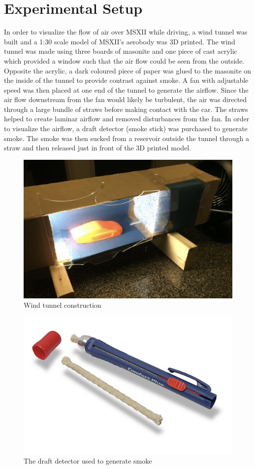 \documentclass[12pt]{article}
\begin{document}
\section{Experimental Setup}
In order to visualize the flow of air over MSXII while driving, a wind tunnel was built and a 1:30 scale model of MSXII's aerobody was 3D printed. The wind tunnel was made using three boards of masonite and one piece of cast acrylic which provided a window such that the air flow could be seen from the outside. Opposite the acrylic, a dark coloured piece of paper was glued to the masonite on the inside of the tunnel to provide contrast against smoke. A fan with adjustable speed was then placed at one end of the tunnel to generate the airflow. Since the air flow downstream from the fan would likely be turbulent, the air was directed through a large bundle of straws before making contact with the car. The straws helped to create laminar airflow and removed disturbances from the fan. In order to visualize the airflow, a draft detector (smoke stick) was purchased to generate smoke. The smoke was then sucked from a reservoir outside the tunnel through a straw and then released just in front of the 3D printed model.

\begin{figure}[h!]
	\centering
	\includegraphics[width=.7\textwidth]{./images/setup1.jpg}
	\caption{Wind tunnel construction}
	\label{fig:setup1}
\end{figure}

\begin{figure}[h!]
	\centering
	\includegraphics[width=.6\textwidth]{./images/draftDetector.png}
	\caption{The draft detector used to generate smoke}
	\label{fig:draftDetector}
\end{figure}
\end{document}
